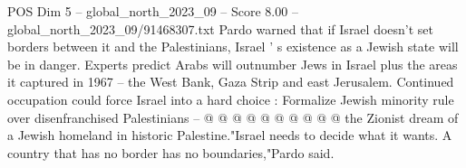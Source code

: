 \begin{textsample}{POS Dim 5 – global\_north\_2023\_09 – Score 8.00 – global\_north\_2023\_09/91468307.txt}
Pardo warned that if Israel doesn't set borders between it and the Palestinians, Israel ' s existence as a Jewish state will be in danger.
Experts predict Arabs will outnumber Jews in Israel plus the areas it captured in 1967 -- the West Bank, Gaza Strip and east Jerusalem.
Continued occupation could force Israel into a hard choice : Formalize Jewish minority rule over disenfranchised Palestinians -- @ @ @ @ @ @ @ @ @ @ the Zionist dream of a Jewish homeland in historic Palestine."Israel needs to decide what it wants.
A country that has no border has no boundaries,"Pardo said.

\end{textsample}

